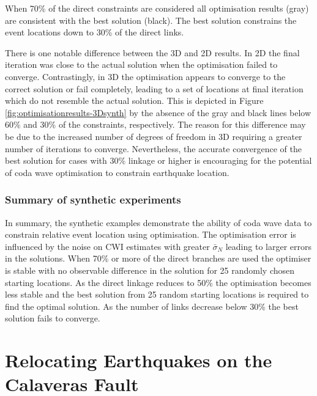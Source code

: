 \documentclass[extra, onecolumn, doublespacing]{gji}
\begin{document}
When 70\% of the direct constraints are considered all optimisation
results (gray) are consistent with the best solution (black). The
best solution constrains the event locations down to 30\% of the
direct links.

There is one notable difference between the 3D and 2D results. In 2D
the final iteration was close to the actual solution when the
optimisation failed to converge. Contrastingly, in 3D the
optimisation appears to converge to the correct solution or fail
completely, leading to a set of locations at final iteration which
do not resemble the actual solution. This is depicted in Figure
\ref{fig:optimisationresults-3Dsynth} by the absence of the gray and
black lines below 60\% and 30\% of the constraints, respectively.
The reason for this difference may be due to the increased number of
degrees of freedom in 3D requiring a greater number of iterations to
converge. Nevertheless, the accurate convergence of the best
solution for cases with 30\% linkage or higher is encouraging for
the potential of coda wave optimisation to constrain earthquake
location.

\subsubsection{Summary of synthetic experiments}

In summary, the synthetic examples demonstrate the ability of coda
wave data to constrain relative event location using optimisation.
The optimisation error is influenced by the noise on CWI estimates
with greater $\bar{\sigma}_N$ leading to larger errors in the
solutions. When 70\% or more of the direct branches are used the
optimiser is stable with no observable difference in the solution
for 25 randomly chosen starting locations. As the direct linkage
reduces to 50\% the optimisation becomes less stable and the best
solution from 25 random starting locations is required to find the
optimal solution. As the number of links decrease below
30\% the best solution fails to converge.


\section{Relocating Earthquakes on the Calaveras Fault}
\label{sec:CalaverasLoc-CWIonly}
\end{document}
